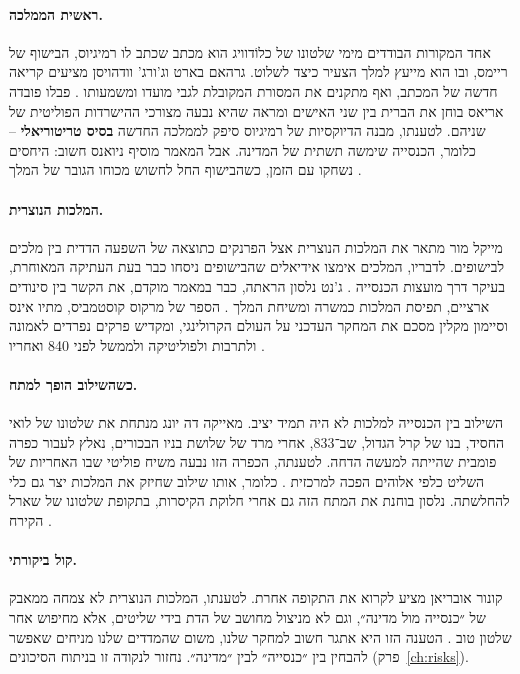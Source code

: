 \paragraph{ראשית הממלכה.} אחד המקורות הבודדים מימי שלטונו של כלוֹדוויג הוא מכתב שכתב לו רמיגיוס, הבישוף של ריימס, ובו הוא מייעץ למלך הצעיר כיצד לשלוט. גרהאם בארט וג'ורג' וודהויסן מציעים קריאה חדשה של המכתב, ואף מתקנים את המסורת המקובלת לגבי מועדו ומשמעותו \cite{barrett2016remigius}. פבלו פובדה אריאס בוחן את הברית בין שני האישים ומראה שהיא נבעה מצורכי ההישרדות הפוליטית של שניהם. לטענתו, מבנה הדיוקסיות של רמיגיוס סיפק לממלכה החדשה \textbf{בסיס טריטוריאלי} – כלומר, הכנסייה שימשה תשתית של המדינה. אבל המאמר מוסיף ניואנס חשוב: היחסים נשחקו עם הזמן, כשהבישוף החל לחשוש מכוחו הגובר של המלך \cite{poveda2019clovis}.

\paragraph{המלכות הנוצרית.} מייקל מור מתאר את המלכות הנוצרית אצל הפרנקים כתוצאה של השפעה הדדית בין מלכים לבישופים. לדבריו, המלכים אימצו אידיאלים שהבישופים ניסחו כבר בעת העתיקה המאוחרת, בעיקר דרך מועצות הכנסייה \cite{moore2011sacred}. ג'נט נלסון הראתה, כבר במאמר מוקדם, את הקשר בין סינודים ארציים, תפיסת המלכות כמשרה ומשיחת המלך \cite{nelson1971synods}. הספר של מרקוס קוסטמביס, מתיו אינס וסיימון מקלין מסכם את המחקר העדכני על העולם הקרולינגי, ומקדיש פרקים נפרדים לאמונה ולתרבות ולפוליטיקה ולממשל לפני 840 ואחריו \cite{costambeys2011carolingian}.

\paragraph{כשהשילוב הופך למתח.} השילוב בין הכנסייה למלכות לא היה תמיד יציב. מאייקה דה יונג מנתחת את שלטונו של לואי החסיד, בנו של קרל הגדול, שב־833, אחרי מרד של שלושת בניו הבכורים, נאלץ לעבור כפרה פומבית שהייתה למעשה הדחה. לטענתה, הכפרה הזו נבעה משיח פוליטי שבו האחריות של השליט כלפי אלוהים הפכה למרכזית \cite{dejong2009penitential}. כלומר, אותו שילוב שחיזק את המלכות יצר גם כלי להחלשתה. נלסון בוחנת את המתח הזה גם אחרי חלוקת הקיסרות, בתקופת שלטונו של שארל הקירח \cite{nelson1991bailiffs}.

\paragraph{קול ביקורתי.} קונור אובריאן מציע לקרוא את התקופה אחרת. לטענתו, המלכות הנוצרית לא צמחה ממאבק של ״כנסייה מול מדינה״, וגם לא מניצול מחושב של הדת בידי שליטים, אלא מחיפוש אחר שלטון טוב \cite{obrien2026rise}. הטענה הזו היא אתגר חשוב למחקר שלנו, משום שהמדדים שלנו מניחים שאפשר להבחין בין ״כנסייה״ לבין ״מדינה״. נחזור לנקודה זו בניתוח הסיכונים (פרק~\ref{ch:risks}).


